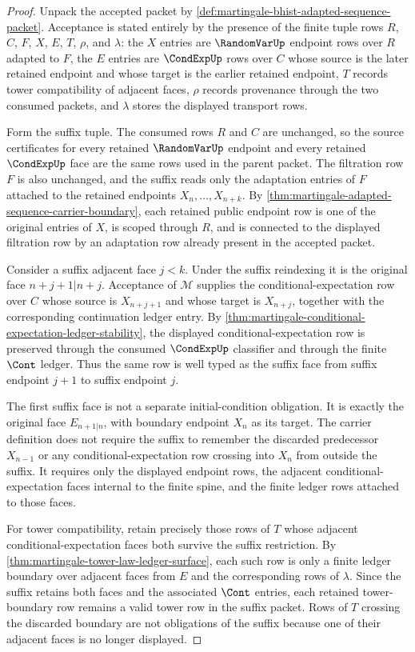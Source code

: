 \begin{proof}
Unpack the accepted packet by \autoref{def:martingale-bhist-adapted-sequence-packet}. Acceptance is stated entirely by the presence of the finite tuple rows $R$, $C$, $F$, $X$, $E$, $T$, $\rho$, and $\lambda$: the $X$ entries are $\RandomVarUp$ endpoint rows over $R$ adapted to $F$, the $E$ entries are $\CondExpUp$ rows over $C$ whose source is the later retained endpoint and whose target is the earlier retained endpoint, $T$ records tower compatibility of adjacent faces, $\rho$ records provenance through the two consumed packets, and $\lambda$ stores the displayed transport rows.

Form the suffix tuple. The consumed rows $R$ and $C$ are unchanged, so the source certificates for every retained $\RandomVarUp$ endpoint and every retained $\CondExpUp$ face are the same rows used in the parent packet. The filtration row $F$ is also unchanged, and the suffix reads only the adaptation entries of $F$ attached to the retained endpoints $X_n,\ldots,X_{n+k}$. By \autoref{thm:martingale-adapted-sequence-carrier-boundary}, each retained public endpoint row is one of the original entries of $X$, is scoped through $R$, and is connected to the displayed filtration row by an adaptation row already present in the accepted packet.

Consider a suffix adjacent face $j<k$. Under the suffix reindexing it is the original face $n+j+1|n+j$. Acceptance of $\mathcal M$ supplies the conditional-expectation row over $C$ whose source is $X_{n+j+1}$ and whose target is $X_{n+j}$, together with the corresponding continuation ledger entry. By \autoref{thm:martingale-conditional-expectation-ledger-stability}, the displayed conditional-expectation row is preserved through the consumed $\CondExpUp$ classifier and through the finite $\Cont$ ledger. Thus the same row is well typed as the suffix face from suffix endpoint $j+1$ to suffix endpoint $j$.

The first suffix face is not a separate initial-condition obligation. It is exactly the original face $E_{n+1|n}$, with boundary endpoint $X_n$ as its target. The carrier definition does not require the suffix to remember the discarded predecessor $X_{n-1}$ or any conditional-expectation row crossing into $X_n$ from outside the suffix. It requires only the displayed endpoint rows, the adjacent conditional-expectation faces internal to the finite spine, and the finite ledger rows attached to those faces.

For tower compatibility, retain precisely those rows of $T$ whose adjacent conditional-expectation faces both survive the suffix restriction. By \autoref{thm:martingale-tower-law-ledger-surface}, each such row is only a finite ledger boundary over adjacent faces from $E$ and the corresponding rows of $\lambda$. Since the suffix retains both faces and the associated $\Cont$ entries, each retained tower-boundary row remains a valid tower row in the suffix packet. Rows of $T$ crossing the discarded boundary are not obligations of the suffix because one of their adjacent faces is no longer displayed.


\end{proof}

